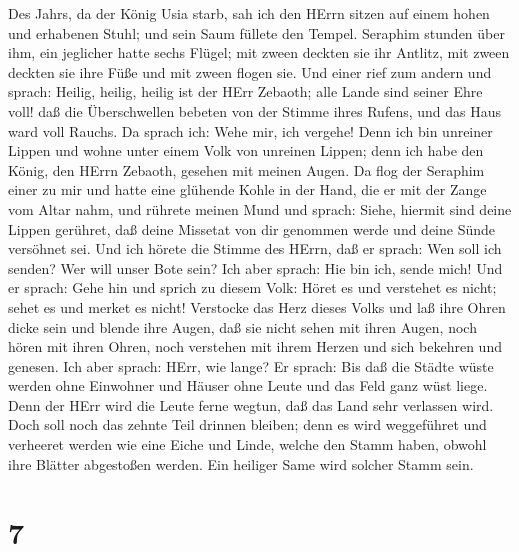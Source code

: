  Des Jahrs, da der König Usia starb, sah ich den HErrn
sitzen auf einem hohen und erhabenen Stuhl; und sein Saum füllete den
Tempel.  Seraphim stunden über ihm, ein jeglicher hatte
sechs Flügel; mit zween deckten sie ihr Antlitz, mit zween deckten sie
ihre Füße und mit zween flogen sie.  Und einer rief zum
andern und sprach: Heilig, heilig, heilig ist der HErr Zebaoth; alle
Lande sind seiner Ehre voll!  daß die Überschwellen bebeten
von der Stimme ihres Rufens, und das Haus ward voll Rauchs. 
Da sprach ich: Wehe mir, ich vergehe! Denn ich bin unreiner Lippen und
wohne unter einem Volk von unreinen Lippen; denn ich habe den König, den
HErrn Zebaoth, gesehen mit meinen Augen.  Da flog der
Seraphim einer zu mir und hatte eine glühende Kohle in der Hand, die er
mit der Zange vom Altar nahm,  und rührete meinen Mund und
sprach: Siehe, hiermit sind deine Lippen gerühret, daß deine Missetat
von dir genommen werde und deine Sünde versöhnet sei.  Und
ich hörete die Stimme des HErrn, daß er sprach: Wen soll ich senden? Wer
will unser Bote sein? Ich aber sprach: Hie bin ich, sende mich!
 Und er sprach: Gehe hin und sprich zu diesem Volk: Höret es
und verstehet es nicht; sehet es und merket es nicht! 
Verstocke das Herz dieses Volks und laß ihre Ohren dicke sein und blende
ihre Augen, daß sie nicht sehen mit ihren Augen, noch hören mit ihren
Ohren, noch verstehen mit ihrem Herzen und sich bekehren und genesen.
 Ich aber sprach: HErr, wie lange? Er sprach: Bis daß die
Städte wüste werden ohne Einwohner und Häuser ohne Leute und das Feld
ganz wüst liege.  Denn der HErr wird die Leute ferne
wegtun, daß das Land sehr verlassen wird.  Doch soll noch
das zehnte Teil drinnen bleiben; denn es wird weggeführet und verheeret
werden wie eine Eiche und Linde, welche den Stamm haben, obwohl ihre
Blätter abgestoßen werden. Ein heiliger Same wird solcher Stamm sein.

\hypertarget{section-6}{%
\section{7}\label{section-6}}

